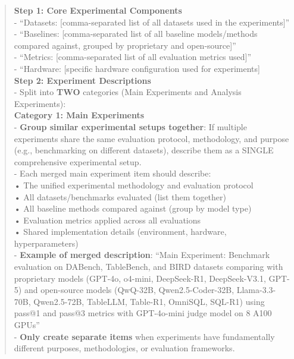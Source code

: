 \begin{quote}
\begin{tcolorbox}[breakable,colback=extraction!20!white, colframe=extraction!60!black, title=\textbf{Prompt for Extraction Agent}]
        \textbf{Step 1: Core Experimental Components}\\
        - ``Datasets: [comma-separated list of all datasets used in the experiments]''\\
        - ``Baselines: [comma-separated list of all baseline models/methods compared against, grouped by proprietary and open-source]''\\
        - ``Metrics: [comma-separated list of all evaluation metrics used]''\\
        - ``Hardware: [specific hardware configuration used for experiments]\\
        
        \textbf{Step 2: Experiment Descriptions}\\
        - Split into \textbf{TWO} categories (Main Experiments and Analysis Experiments):\\
        
        \textbf{Category 1: Main Experiments}\\
        - \textbf{Group similar experimental setups together}: If multiple experiments share the same evaluation protocol, methodology, and purpose (e.g., benchmarking on different datasets), describe them as a SINGLE comprehensive experimental setup.\\
        - Each merged main experiment item should describe:\\
        • The unified experimental methodology and evaluation protocol\\
        • All datasets/benchmarks evaluated (list them together)\\
        • All baseline methods compared against (group by model type)\\
        • Evaluation metrics applied across all evaluations\\
        • Shared implementation details (environment, hardware, hyperparameters)\\
        - \textbf{Example of merged description}: ``Main Experiment: Benchmark evaluation on DABench, TableBench, and BIRD datasets comparing with proprietary models (GPT-4o, o4-mini, DeepSeek-R1, DeepSeek-V3.1, GPT-5) and open-source models (QwQ-32B, Qwen2.5-Coder-32B, Llama-3.3-70B, Qwen2.5-72B, TableLLM, Table-R1, OmniSQL, SQL-R1) using pass@1 and pass@3 metrics with GPT-4o-mini judge model on 8 A100 GPUs''\\
        - \textbf{Only create separate items} when experiments have fundamentally different purposes, methodologies, or evaluation frameworks.\\
        

\end{tcolorbox}
\end{quote}
